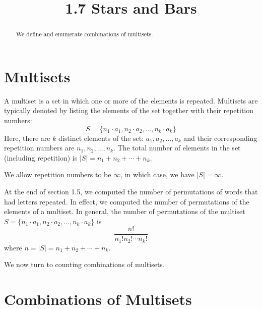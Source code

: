 \documentclass[handout]{ximera}
\title{1.7 Stars and Bars}
\begin{document}
\begin{abstract}
We define and enumerate combinations of multisets.
\end{abstract}

\maketitle





\section{Multisets}

\begin{definition}[Multiset]
A multiset is a set in which one or more of the elements is repeated.  Multisets are typically denoted by listing the elements  of the set together with their repetition numbers:
\[
S = \{n_1 \cdot a_1, n_2 \cdot a_2, \ldots, n_k \cdot a_k\}
\]
 Here, there are $k$ distinct elements of the set: $a_1, a_2, \ldots, a_k$
 and their corresponding repetition numbers are $n_1, n_2, ..., n_k$.
 The total number of elements in the set (including repetition) is $|S| = n_1 + n_2 + \cdots + n_k$.
 \end{definition}
 
 \begin{remark} 
 We allow repetition numbers to be $\infty$, in which case, we have $|S| = \infty$.
 \end{remark}
 
 At the end of section 1.5, we computed the number of permutations of words that had letters repeated.  In effect, we computed the number of permutations of the elements of a multiset. In general, the number of permutations of the 
 multiset $S = \{n_1 \cdot a_1, n_2 \cdot a_2, \ldots, n_k \cdot a_k\}$ is
 \[
 \frac{n!}{n_1! n_2! \cdots n_k!}
 \]
 where $n = |S| = n_1 + n_2 + \cdots + n_k$.
 
 We now turn to counting combinations of multisets.
 

\section{Combinations of Multisets}
\end{document}
